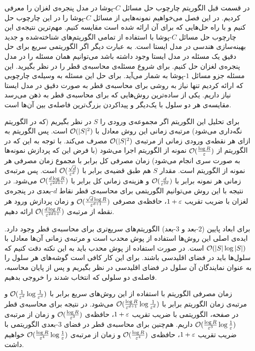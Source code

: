در قسمت قبل الگوریتم چارچوب حل مسائل $C$-پوشا در مدل پنجره‌ی لغزان را معرفی کردیم. در این فصل می‌خواهیم نمونه‌هایی از مسائل $C$-پوشا را در این چارچوب حل کنیم و با راه حل‌‌هایی که برای آن ارائه شده است مقایسه کنیم. مهم‌ترین نتیجه‌ی این چارچوب حل مسائل $C$-پوشا با استفاده از تمامی الگوریتم‌های شناخته‌شده و جدید بهینه‌سازی هندسی در مدل ایستا است. به عبارت دیگر اگر الگوریتمی سریع برای حل دقیق یک مسئله‌ در مدل ایستا وجود داشته باشد می‌توانیم همان مسئله را در مدل پنجره‌ی لغزان حل کنیم.
برای شروع مسئله‌ی محاسبه‌ی قطر را در نظر بگیرید. این مسئله جزو مسائل $1$-پوشا به شمار می‌آید. برای حل این مسئله به وسیله‌ی چارچوبی که ارائه کردیم تنها نیاز به روشی برای محاسبه‌ی قطر به صورت دقیق در مدل ایستا نیاز داریم.
یکی از ساده‌ترین روش‌هایی که برای محاسبه‌ی قطر به ذهن می‌رسد مقایسه‌ی هر دو سلول با یک‌دیگر و پیدا‌کردن بزرگ‌ترین‌ فاصله‌ی بین آن‌ها است.

برای تحلیل این الگوریتم اگر مجموعه‌ی ورودی را $S$ در نظر بگیریم (که در الگوریتم  نگه‌داری می‌شود) مرتبه‌ی زمانی این روش معادل با 
$\mathcal{O}(|S|^2)$
است. پس الگوریتم  به ازای هر نقطه‌ی ورودی زمانی از مرتبه‌ی $\mathcal{O}(|S|^2)$ مصرف می‌کند. با توجه به این که در الگوریتم  از 
$\mathcal{O}(\frac{\log R}{\varepsilon})$
نمونه از الگوریتم  اجرا می‌شود (با فرض این که پردازش نمونه‌ها به صورت سری انجام می‌شود) زمان مصرفی کل برابر با مجموع زمان مصرفی هر نمونه از الگوریتم است. مقدار $S$ هم طبق قضیه‌ی  برابر با
$\mathcal{O}(\frac{\sqrt{d}}{\varepsilon^d})$
	است. پس مرتبه‌ی زمانی هر نمونه برابر با
$\mathcal{O}(\frac{d}{\varepsilon^{2d}})$
	و هزینه‌ی زمانی کل برابر با
$\mathcal{O}(\frac{d \log R}{\varepsilon^{2d+1}})$
	می‌شود.
 در نتیجه با این روش می‌توانیم الگوریتمی برای محاسبه‌ی قطر نقاط $d$-بعدی در پنجره‌ی لغزان با ضریب تقریب $1+\varepsilon$، حافظه‌ی مصرفی 
 $\mathcal{O}(\frac{\sqrt{d} \log R}{\varepsilon^{d+1}})$
  و زمان پردازش ورود هر نقطه از مرتبه‌ی
   $\mathcal{O}(\frac{d \log R}{\varepsilon^{2d+1}})$
   	 ارائه دهیم.
   	 
برای ابعاد پایین ($2$-بعد و $3$-بعد) الگوریتم‌های سریع‌تری برای محاسبه‌ی قطر وجود دارد. ایده‌ی اصلی این روش‌ها استفاده از پوش محدب است و مرتبه‌ی زمانی آن‌ها معادل با
$\mathcal{O}(|S| \log |S|)$
است. در صورت استفاده از پوش محدب باید به این نکته دقت کنیم که سلول‌ها باید در فضای اقلیدسی باشند. برای این کار کافی است گوشه‌های هر سلول را به عنوان نمایندگان آن سلول در فضای اقلیدسی در نظر بگیریم و پس از پایان محاسبه، فاصله‌ی دو سلولی که انتخاب شدند را خروجی بدهیم.

زمان مصرفی الگوریتم  با استفاده از این روش‌های سریع برابر با
$\mathcal{O}(\frac{1}{\varepsilon^{d}} \log \frac{1}{\varepsilon^{d}})$
و مرتبه‌ی زمان الگوریتم  برابر با
$\mathcal{O}(\frac{\log R}{\varepsilon^{d+1}} \log \frac{1}{\varepsilon^{d}})$
می‌شود. در نتیجه برای محاسبه‌ی قطر در صفحه، الگوریتمی با ضریب تقریب $1 + \varepsilon$، حافظه‌ی
 $\mathcal{O}(\frac{\log R}{\varepsilon^{3}})$
 و زمان از مرتبه‌ی 
  $\mathcal{O}(\frac{\log R}{\varepsilon^{3}} \log \frac{1}{\varepsilon})$
  داریم. هم‌چنین برای محاسبه‌ی قطر در فضای $3$-بعدی الگوریتمی با ضریب تقریب $1 + \varepsilon$، حافظه‌ی
  $\mathcal{O}(\frac{\log R}{\varepsilon^{4}})$
  و زمان از مرتبه‌ی 
  $\mathcal{O}(\frac{\log R}{\varepsilon^{4}} \log \frac{1}{\varepsilon})$
خواهیم داشت.
 

